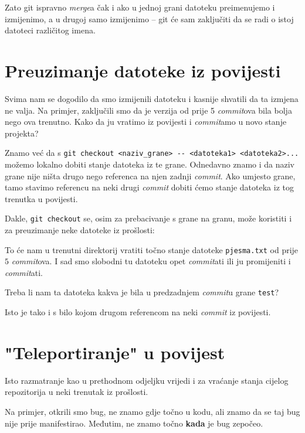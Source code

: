 Zato git ispravno \emph{merge}a čak i ako u jednoj grani datoteku preimenujemo i izmijenimo, a u drugoj samo izmijenimo -- git će sam zaključiti da se radi o istoj datoteci različitog imena.

\section*{Preuzimanje datoteke iz povijesti}

Svima nam se dogodilo da smo izmijenili datoteku i kasnije shvatili da ta izmjena ne valja. 
Na primjer, zaključili smo da je verzija od prije 5 \emph{commit}ova bila bolja nego ova trenutno.
Kako da ju vratimo iz povijesti i \emph{commit}amo u novo stanje projekta?

Znamo već da s \verb+git checkout <naziv_grane> -- <datoteka1> <datoteka2>...+ možemo lokalno dobiti stanje datoteka iz te grane.
Odnedavno znamo i da naziv grane nije ništa drugo nego referenca na njen zadnji \emph{commit}.
Ako umjesto grane, tamo stavimo referencu na neki drugi \emph{commit} dobiti ćemo stanje datoteka iz tog trenutka u povijesti.

Dakle, \verb+git checkout+ se, osim za prebacivanje s grane na granu, može koristiti i za preuzimanje neke datoteke iz prošlosti:


To će nam u trenutni direktorij vratiti točno stanje datoteke \verb+pjesma.txt+ od prije $5$ \emph{commit}ova.
I sad smo slobodni tu datoteku opet \emph{commit}ati ili ju promijeniti i \emph{commit}ati.

Treba li nam ta datoteka kakva je bila u predzadnjem \emph{commit}u grane \verb+test+?


Isto je tako i s bilo kojom drugom referencom na neki \emph{commit} iz povijesti.

\section*{"Teleportiranje" u povijest}

Isto razmatranje kao u prethodnom odjeljku vrijedi i za vraćanje stanja cijelog repozitorija u neki trenutak iz prošlosti.

Na primjer, otkrili smo bug, ne znamo gdje točno u kodu, ali znamo da se taj bug nije prije manifestirao. 
Međutim, ne znamo točno \textbf{kada} je bug zepočeo.

